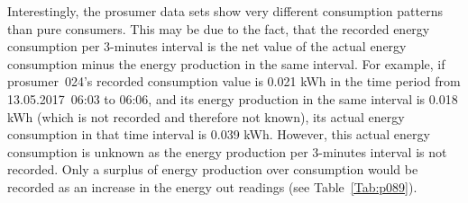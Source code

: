 Interestingly, the prosumer data sets show very different consumption patterns than pure consumers. This may be due to the fact, that the recorded energy consumption per 3-minutes interval is the net value of the actual energy consumption minus the energy production in the same interval. For example, if prosumer~024's recorded consumption value is 0.021 kWh in the time period from 13.05.2017~06:03 to 06:06, and its energy production in the same interval is 0.018 kWh (which is not recorded and therefore not known), its actual energy consumption in that time interval is 0.039 kWh. However, this actual energy consumption is unknown as the energy production per 3-minutes interval is not recorded. Only a surplus of energy production over consumption would be recorded as an increase in the energy out readings (see Table~\ref{Tab:p089}).

